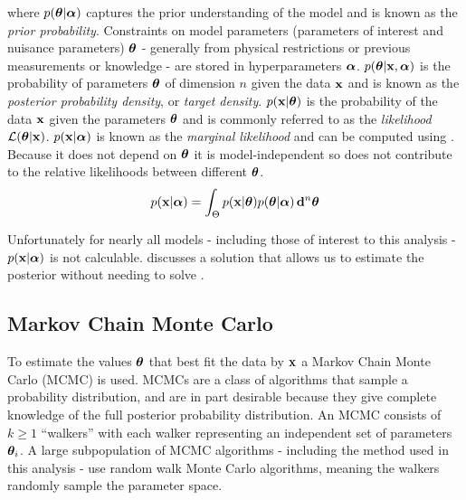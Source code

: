 \noindent where $p(\boldsymbol{\theta}|\boldsymbol{\alpha})$ captures the prior understanding of the model and is known as the
\textit{prior probability}.  Constraints on model parameters (parameters of interest and nuisance parameters) $\boldsymbol{\theta}$ - generally
from physical restrictions or previous measurements or
knowledge - are stored in hyperparameters $\boldsymbol{\alpha}$.  $p(\boldsymbol{\theta}|\mathbf{x}, \boldsymbol{\alpha})$ is the probability of
parameters $\boldsymbol{\theta}$ of dimension $n$ given the
data $\mathbf{x}$ and is known as the \textit{posterior probability density}, or \textit{target
density}.  $p(\mathbf{x}|\boldsymbol{\theta})$ is the probability of the data $\mathbf{x}$ given the parameters
$\boldsymbol{\theta}$ and is
commonly referred to as the \textit{likelihood} $\mathcal{L}(\boldsymbol{\theta}|\mathbf{x})$.  $p(\mathbf{x}|\boldsymbol{\alpha})$ is known as
the \textit{marginal likelihood}
and can be computed using .  Because it does not depend on
$\boldsymbol{\theta}$ it is model-independent so does not contribute to the relative likelihoods between different
$\boldsymbol{\theta}$.
\begin{equation}
p(\mathbf{x}|\boldsymbol{\alpha}) = \int_{\Theta} p(\mathbf{x}|\boldsymbol{\theta}) p(\boldsymbol{\theta}|\boldsymbol{\alpha})\, \mathbf{d}^n \boldsymbol{\theta}
\label{eq:er_nr_calibrations_parameter_determ_mc_match_p_data}
\end{equation}

Unfortunately for nearly all models - including those of interest to this analysis - $p(\mathbf{x}|\boldsymbol{\alpha})$ is not
calculable.   discusses a solution that allows us to estimate the posterior
without needing to solve .



\subsection{Markov Chain Monte Carlo}
\label{subsec:er_nr_calibrations_parameter_determ_mcmc}
To estimate the values $\boldsymbol{\theta}$ that best fit the data by $\mathbf{x}$ a Markov Chain Monte Carlo (MCMC) is used.  MCMCs
are a class of algorithms that sample a probability distribution, and are in part desirable because they
give complete knowledge of the full posterior probability
distribution.  An MCMC consists of $k \geq 1$ ``walkers'' with each walker representing an independent set of parameters
$\boldsymbol{\theta}_i$.  A large
subpopulation of MCMC algorithms - including the method used in this analysis - use random walk Monte Carlo algorithms, meaning the
walkers randomly sample the parameter space.

